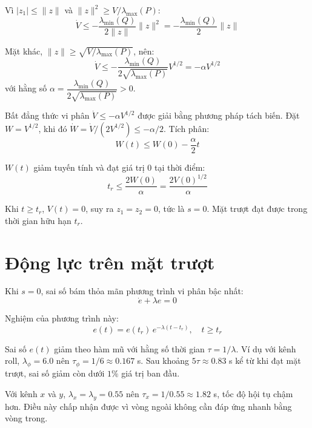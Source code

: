 \documentclass[12pt,a4paper]{report}
\begin{document}
Vì $|z_1| \le \|z\|$ và $\|z\|^2 \ge V / \lambda_{\max}(P)$:
\begin{equation}
\dot{V} \le -\frac{\lambda_{\min}(Q)}{2\|z\|} \|z\|^2 = -\frac{\lambda_{\min}(Q)}{2} \|z\|
\end{equation}

Mặt khác, $\|z\| \ge \sqrt{V / \lambda_{\max}(P)}$, nên:
\begin{equation}
\dot{V} \le -\frac{\lambda_{\min}(Q)}{2\sqrt{\lambda_{\max}(P)}} V^{1/2} = -\alpha V^{1/2}
\end{equation}
với hằng số $\alpha = \dfrac{\lambda_{\min}(Q)}{2\sqrt{\lambda_{\max}(P)}} > 0$.

Bất đẳng thức vi phân $\dot{V} \le -\alpha V^{1/2}$ được giải bằng phương pháp tách biến. Đặt $W = V^{1/2}$, khi đó $\dot{W} = \dot{V} / (2V^{1/2}) \le -\alpha / 2$. Tích phân:
\begin{equation}
W(t) \le W(0) - \frac{\alpha}{2} t
\end{equation}

$W(t)$ giảm tuyến tính và đạt giá trị $0$ tại thời điểm:
\begin{equation}
t_r \le \frac{2W(0)}{\alpha} = \frac{2V(0)^{1/2}}{\alpha}
\end{equation}

Khi $t \ge t_r$, $V(t) = 0$, suy ra $z_1 = z_2 = 0$, tức là $s = 0$. Mặt trượt đạt được trong thời gian hữu hạn $t_r$.

\section{Động lực trên mặt trượt}
Khi $s = 0$, sai số bám thỏa mãn phương trình vi phân bậc nhất:
\begin{equation}
\dot{e} + \lambda e = 0
\end{equation}

Nghiệm của phương trình này:
\begin{equation}
e(t) = e(t_r) \, e^{-\lambda(t - t_r)}, \quad t \ge t_r
\end{equation}

Sai số $e(t)$ giảm theo hàm mũ với hằng số thời gian $\tau = 1/\lambda$. Ví dụ với kênh roll, $\lambda_\phi = 6.0$ nên $\tau_\phi = 1/6 \approx 0.167$ s. Sau khoảng $5\tau \approx 0.83$ s kể từ khi đạt mặt trượt, sai số giảm còn dưới $1\%$ giá trị ban đầu.

Với kênh $x$ và $y$, $\lambda_x = \lambda_y = 0.55$ nên $\tau_x = 1/0.55 \approx 1.82$ s, tốc độ hội tụ chậm hơn. Điều này chấp nhận được vì vòng ngoài không cần đáp ứng nhanh bằng vòng trong.
\end{document}
